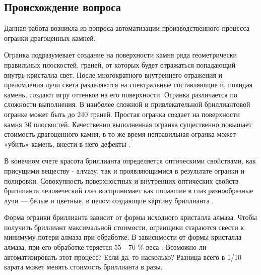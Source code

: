 \documentclass[a4paper,12pt, titlepage]{article}
\begin{document}
\subsection{Происхождение вопроса}
\begin{flushleft}
Данная работа возникла из вопроса автоматизации производственного процесса огранки драгоценных 
камней. 
\end{flushleft}
\begin{flushleft}
Огранка подразумевает создание на поверхности камня ряда геометрически правильных плоскостей, 
граней, от которых будет отражаться попадающий внутрь кристалла свет. После многократного 
внутреннего отражения и преломления лучи света разделяются на спектральные составляющие и, 
покидая камень, создают игру оттенков на его поверхности.
Огранка различается по сложности выполнения. В наиболее сложной и привлекательной бриллиантовой 
огранке может быть до 240 граней. Простая огранка создает на поверхности камня 30 плоскостей.
Качественно выполненная огранка существенно повышает стоимость драгоценного камня, в то же 
время неправильная огранка может «убить» камень, внести в него дефекты \cite{wiki-ogranka}. 
\end{flushleft}
\begin{flushleft}
В конечном счете красота бриллианта определяется оптическими свойствами, как присущими 
веществу - алмазу, так и проявляющимися в результате огранки и полировки. Совокупность 
поверхностных и внутренних оптических свойств бриллианта человеческий глаз воспринимает 
как попавшие в глаз разнообразные лучи — белые и цветные, в целом создающие картину 
бриллианта \cite{3dbook}. 
\end{flushleft}
\begin{flushleft}
 Форма огранки бриллианта зависит от формы исходного кристалла алмаза. Чтобы получить 
бриллиант максимальной стоимости, огранщики стараются свести к минимуму потери алмаза при обработке. 
В зависимости от формы кристалла алмаза, при его обработке теряется 55—70 \% веса \cite{wiki-almaz}. 
Возможно ли автоматизировать этот процесс? Если да, то насколько? Разница всего в 1/10 карата
может менять стоимость бриллианта в разы.
\end{flushleft}
\end{document}
